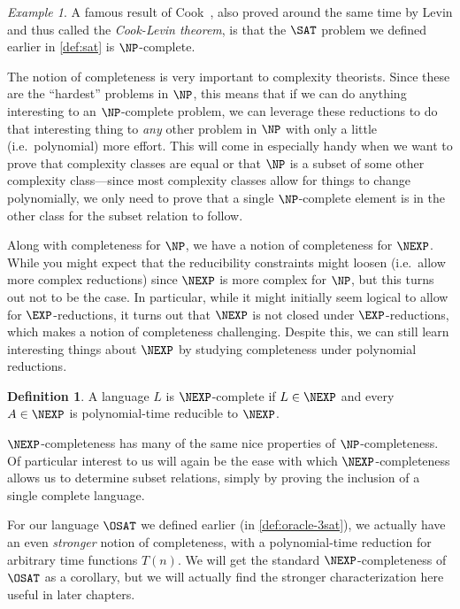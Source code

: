 \documentclass[english,12pt]{reedthesis}
\theoremstyle{plain}
\theoremstyle{definition}
\newtheorem{defn}[defn]{Definition}
\theoremstyle{remark}
\newtheorem{example}{Example}[thm]
\begin{document}
\begin{example}\label{ex:sat-is-complete}
  A famous result of Cook~\cite{Cook71}, also proved around the same time by
  Levin and thus called the \emph{Cook-Levin theorem}, is that the $\SAT$
  problem we defined earlier in \cref{def:sat} is $\NP$-complete.
\end{example}

The notion of completeness is very important to complexity theorists. Since
these are the ``hardest'' problems in $\NP$, this means that if we can do
anything interesting to an $\NP$-complete problem, we can leverage these
reductions to do that interesting thing to \emph{any} other problem in $\NP$
with only a little (i.e.\ polynomial) more effort. This will come in especially
handy when we want to prove that complexity classes are equal or that $\NP$ is a
subset of some other complexity class---since most complexity classes allow for
things to change polynomially, we only need to prove that a single
$\NP$-complete element is in the other class for the subset relation to follow.

Along with completeness for $\NP$, we have a notion of completeness for $\NEXP$.
While you might expect that the reducibility constraints might loosen (i.e.\
allow more complex reductions) since $\NEXP$ is more complex for $\NP$, but this
turns out not to be the case. In particular, while it might initially seem
logical to allow for $\EXP$-reductions, it turns out that $\NEXP$ is not closed
under $\EXP$-reductions, which makes a notion of completeness challenging.
Despite this, we can still learn interesting things about $\NEXP$ by studying
completeness under polynomial reductions.

\begin{defn}\label{def:nexp-complete}
  A language $L$ is $\NEXP$-complete if $L \in \NEXP$ and every $A \in \NEXP$ is
  polynomial-time reducible to $\NEXP$.
\end{defn}

$\NEXP$-completeness has many of the same nice properties of $\NP$-completeness.
Of particular interest to us will again be the ease with which
$\NEXP$-completeness allows us to determine subset relations, simply by proving
the inclusion of a single complete language.

For our language $\OSAT$ we defined earlier (in \cref{def:oracle-3sat}), we
actually have an even \emph{stronger} notion of completeness, with a
polynomial-time reduction for arbitrary time functions $T(n)$. We will get the
standard $\NEXP$-completeness of $\OSAT$ as a corollary, but we will actually
find the stronger characterization here useful in later chapters.
\end{document}
